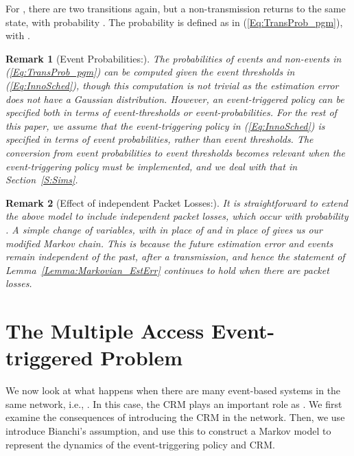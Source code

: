 \documentclass[journal]{IEEEtran}
\newtheorem{remark}{Remark}[section]
\begin{document}
For , there are two transitions again, but a non-transmission returns to the same state, with probability . The probability  is defined as in (\ref{Eq:TransProb_pgm}), with .

\begin{remark}[Event Probabilities:]
The probabilities of events and non-events in (\ref{Eq:TransProb_pgm}) can be computed given the event thresholds in (\ref{Eq:InnoSched}), though this computation is not trivial as the estimation error does not have a Gaussian distribution. However, an event-triggered policy can be specified both in terms of event-thresholds or event-probabilities. For the rest of this paper, we assume that the event-triggering policy in (\ref{Eq:InnoSched}) is specified in terms of event probabilities, rather than event thresholds. The conversion from event probabilities to event thresholds becomes relevant when the event-triggering policy must be implemented, and we deal with that in Section~\ref{S:Sims}.
\end{remark}

\begin{remark}[Effect of independent Packet Losses:]
It is straightforward to extend the above model to include independent packet losses, which occur with probability . A simple change of variables, with  in place of  and  in place of  gives us our modified Markov chain. This is because the future estimation error and events remain independent of the past, after a transmission, and hence the statement of Lemma~\ref{Lemma:Markovian_EstErr} continues to hold when there are packet losses.
\end{remark}

\section{The Multiple Access Event-triggered Problem} \label{S:MA_ET}

We now look at what happens when there are many event-based systems in the same network, i.e., . In this case, the CRM plays an important role as . We first examine the consequences of introducing the CRM in the network. Then, we use introduce Bianchi's assumption, and use this to construct a Markov model to represent the dynamics of the event-triggering policy and CRM.
\end{document}

